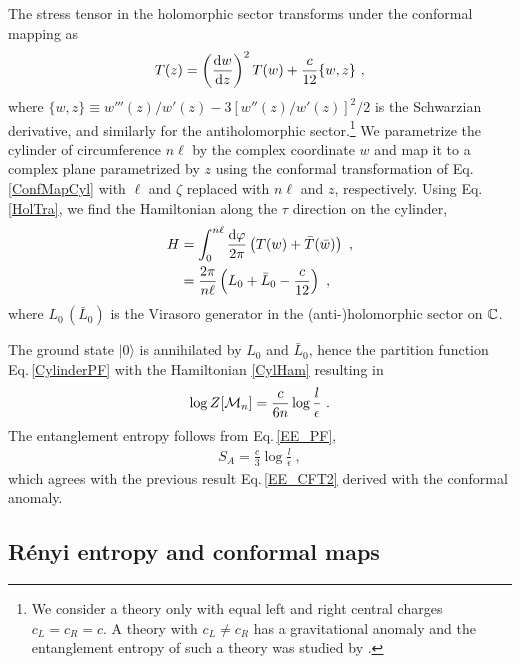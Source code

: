 The stress tensor in the holomorphic sector transforms under the conformal mapping as
\begin{align}\label{HolTra}
	T(z) = \left( \frac{\mathrm{d} w}{\mathrm{d} z}\right)^2 T(w) + \frac{c}{12}\{ w, z\} \ ,
\end{align}
where $\{ w, z\} \equiv w'''(z)/w'(z) - 3[ w''(z)/w'(z)]^2/2$ is the Schwarzian derivative, and similarly for the antiholomorphic sector.\footnote{We consider a theory only  with equal left and right central charges $c_L=c_R = c$. A theory with $c_L\neq c_R$ has a gravitational anomaly and the entanglement entropy of such a theory was studied by \textcite{Castro:2014tta,Azeyanagi:2015uoa,Nishioka:2015uka,Hughes:2015ora,Iqbal:2015vka}.}
We parametrize the cylinder of circumference $n\ell$ by the complex coordinate $w$ and map it to a complex plane parametrized by $z$ using the conformal transformation of Eq.\,\eqref{ConfMapCyl} with $\ell$ and $\zeta$ replaced with $n\ell$ and $z$, respectively.
Using Eq.\,\eqref{HolTra}, we find the Hamiltonian along the $\tau$ direction on the cylinder,
\begin{align}\label{CylHam}
\begin{aligned}
	H &= \int_0^{n\ell} \frac{\mathrm{d}\varphi}{2\pi} \left(T(w) + \bar T(\bar w)\right) \ , \\
		&= \frac{2\pi}{n\ell} \left( L_0 + \bar L_0 - \frac{c}{12} \right) \ ,
\end{aligned}
\end{align}
where $L_0\, (\bar L_0)$ is the Virasoro generator in the (anti-)holomorphic sector on $\mathbb{C}$.
 
The ground state $|0\rangle$ is annihilated by $L_0$ and $\bar L_0$, hence the partition function Eq.\,\eqref{CylinderPF} with the Hamiltonian \eqref{CylHam} resulting in
\begin{align}
	\log Z[{\cal M}_n] = \frac{c }{6n} \log \frac{l}{\epsilon} \ .
\end{align}
The entanglement entropy follows from Eq.\,\eqref{EE_PF},
\begin{align}
	S_A = \frac{c}{3}\log \frac{l}{\epsilon} \ ,
\end{align}
which agrees with the previous result Eq.\,\eqref{EE_CFT2} derived with the conformal anomaly.




\subsection{R{\'e}nyi entropy and conformal maps}\label{ss:Renyi_CFT}

